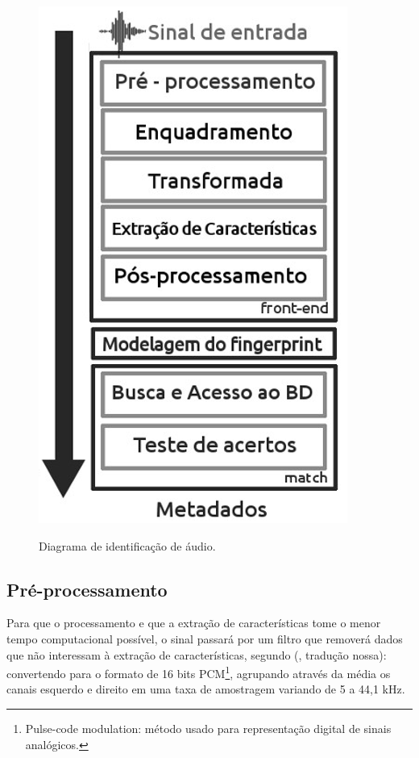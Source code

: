 \begin{figure}[h]
\caption{\small Diagrama de identificação de áudio.}
\centering
\includegraphics[scale=0.50]{figs/arquitetura.png}
\label{f.diagrama}
\end{figure}

\subsection{Pré-processamento}
\label{ss.preprocessamento}

Para que o processamento e que a extração de características tome o menor tempo computacional possível, o sinal passará por um filtro que removerá dados que não interessam à extração de características, segundo  (\citeyear{canoetal05}, tradução nossa): convertendo para o formato de 16 bits PCM\footnote{Pulse-code modulation: método usado para representação digital de sinais analógicos.}, agrupando através da média os canais esquerdo e direito em uma taxa de amostragem variando de 5 a 44,1 kHz.

